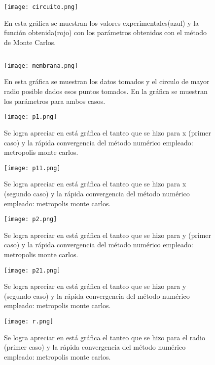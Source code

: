 \documentclass{article}
\begin{document}
\begin{figure}[H]
\centering
\texttt{[image: circuito.png]}
\caption{En esta gráfica se muestran los valores experimentales(azul) y la función obtenida(rojo) con los parámetros obtenidos con el método de Monte Carlos.}
\label{circuito}
\end{figure}

\subsection*{}

\begin{figure}[H]
\centering
\texttt{[image: membrana.png]}
\caption{En esta gráfica se muestran los datos tomados y el circulo de mayor radio posible dados esos puntos tomados. En la gráfica se muestran los parámetros para ambos casos.}
\label{membrana}
\end{figure}


\begin{figure}[H]
\centering
\texttt{[image: p1.png]}
\caption{Se logra apreciar en está gráfica el tanteo que se hizo para x (primer caso) y la rápida convergencia del método numérico empleado: metropolis monte carlos.}
\label{p1}
\end{figure}

\begin{figure}[H]
\centering
\texttt{[image: p11.png]}
\caption{Se logra apreciar en está gráfica el tanteo que se hizo para x (segundo caso) y la rápida convergencia del método numérico empleado: metropolis monte carlos.}
\label{p11}
\end{figure}

\begin{figure}[H]
\centering
\texttt{[image: p2.png]}
\caption{Se logra apreciar en está gráfica el tanteo que se hizo para y (primer caso) y la rápida convergencia del método numérico empleado: metropolis monte carlos.}
\label{p2}
\end{figure}

\begin{figure}[H]
\centering
\texttt{[image: p21.png]}
\caption{Se logra apreciar en está gráfica el tanteo que se hizo para y (segundo caso) y la rápida convergencia del método numérico empleado: metropolis monte carlos.}
\label{p21}
\end{figure}

\begin{figure}[H]
\centering
\texttt{[image: r.png]}
\caption{Se logra apreciar en está gráfica el tanteo que se hizo para el radio (primer caso) y la rápida convergencia del método numérico empleado: metropolis monte carlos.}
\label{r}
\end{figure}
\end{document}
